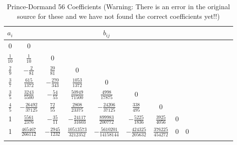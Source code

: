 


\begin{table*}[htb]
\centering \vspace{0 pt}
\caption[Prince-Dormand 56 Coefficients]{Prince-Dormand 56 Coefficients (Warning:  There is an error in the original source for these and we have not found the correct coefficients yet!!) }
\begin{tabular}{c|cccccccccccccc}
   $a_i$ & & & & $b_{ij}$  \\
   \hline\hline
    0 &
    0 & \vspace{.1in} \\
    $\frac{1}{10}$ &
    $\frac{1}{10}$ &
    0 &  \vspace{.1in} \\
    $\frac{2}{9}$ &
    $-\frac{2}{81}$ &
    $\frac{20}{81}$ &
    0 &  \vspace{.1in} \\
    $\frac{3}{7}$ &
    $\frac{615}{1372}$ &
    $-\frac{270}{343}$ &
    $\frac{1053}{1372}$ &
    0 &  \vspace{.1in} \\
    $\frac{3}{5}$ &
    $\frac{3243}{5500}$ &
    $-\frac{54}{55}$ &
    $\frac{50949}{71500}$ &
    $\frac{4998}{17875}$ &
    0 &  \vspace{.1in} \\
    $\frac{4}{5}$ &
    $-\frac{26492}{37125}$ &
    $\frac{72}{55}$ &
    $\frac{2808}{23375}$ &
    $-\frac{24206}{37125}$ &
    $\frac{338}{495}$ &
    0 &  \vspace{.1in} \\
    1 &
    $\frac{5561}{2376}$ &
    $-\frac{35}{11}$ &
    $-\frac{24117}{31603}$ &
    $\frac{899983}{200772}$ &
    $-\frac{5225}{1836}$ &
    $\frac{3925}{4056}$ &
    0 &  \vspace{.1in} \\
    1 &
    $\frac{465467}{266112}$ &
    $-\frac{2945}{1232}$ &
    $\frac{10513573}{3212352}$ &
    $-\frac{5610201}{14158144}$ &
    $-\frac{424325}{205632}$ &
    $\frac{376225}{454272}$ &
    0 &
    0 & \\ \hline \\

\end{tabular}
\end{table*}
